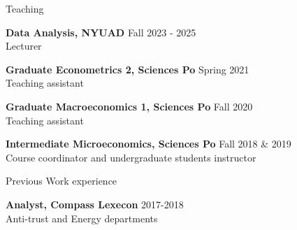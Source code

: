 \documentclass{resume} %
\begin{document}

\begin{rSection}{Teaching}

{\bf Data Analysis, NYUAD} \hfill {Fall 2023 - 2025}
  \\ Lecturer

{\bf Graduate Econometrics 2, Sciences Po} \hfill {Spring 2021}
  \\ Teaching assistant

{\bf Graduate Macroeconomics 1, Sciences Po} \hfill {Fall 2020}
  \\ Teaching assistant


{\bf Intermediate Microeconomics, Sciences Po} \hfill {Fall 2018 \& 2019}
\\ Course coordinator and undergraduate students instructor

\end{rSection}


\begin{rSection}{Previous Work experience}


{\bf Analyst, Compass Lexecon} \hfill {2017-2018}
\\ Anti-trust and Energy departments


\end{rSection}

\end{document}
